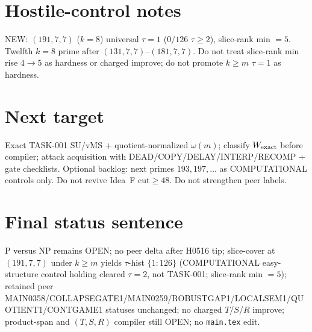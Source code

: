 \documentclass[11pt]{article}
\begin{document}
\section*{Hostile-control notes}
NEW: $(191,7,7)$ ($k{=}8$) universal $\tau{=}1$ ($0/126$ $\tau{\ge}2$), slice-rank min $=5$.
Twelfth $k{=}8$ prime after $(131,7,7)$--$(181,7,7)$.
Do not treat slice-rank min rise $4\to5$ as hardness or charged improve;
do not promote $k{\ge}m$ $\tau{=}1$ as hardness.

\section*{Next target}
Exact TASK-001 SU/vMS + quotient-normalized $\omega(m)$; classify $W_{\rm exact}$ before compiler;
attack acquisition with DEAD/COPY/DELAY/INTERP/RECOMP + gate checklists.
Optional backlog: next primes $193,197,\ldots$ as COMPUTATIONAL controls only.
Do not revive Idea~F cut$\ge48$. Do not strengthen peer labels.

\section*{Final status sentence}
P versus NP remains OPEN; no peer delta after H0516 tip; slice-cover at $(191,7,7)$ under $k{\ge}m$ yields $\tau$-hist $\{1{:}126\}$ (COMPUTATIONAL easy-structure control holding cleared $\tau{=}2$, not TASK-001; slice-rank min $=5$); retained peer MAIN0358/COLLAPSEGATE1/MAIN0259/ROBUSTGAP1/LOCALSEM1/QUOTIENT1/CONTGAME1 statuses unchanged; no charged $T$/$S$/$R$ improve; product-span and $(T,S,R)$ compiler still OPEN; no \texttt{main.tex} edit.
\end{document}
